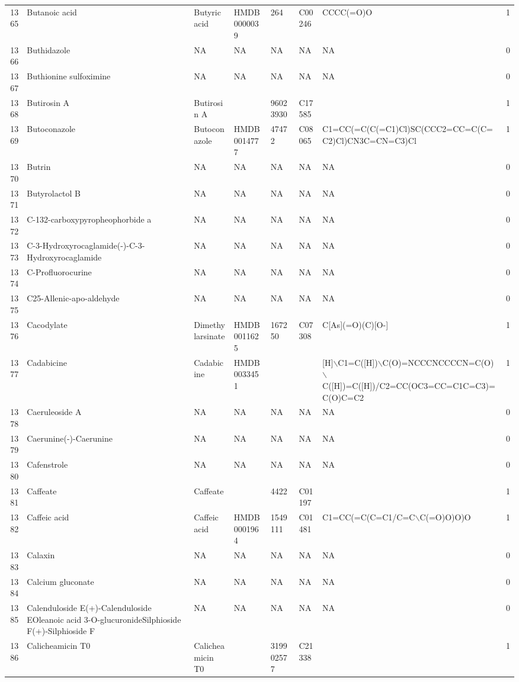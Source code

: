 \documentclass[a4paper]{article}
\begin{document}
\begin{longtable}{rlllllll}
  1365 & Butanoic acid & Butyric acid & HMDB0000039 & 264 & C00246 & CCCC(=O)O & 1 \\ 
  1366 & Buthidazole & NA & NA & NA & NA & NA & 0 \\ 
  1367 & Buthionine sulfoximine & NA & NA & NA & NA & NA & 0 \\ 
  1368 & Butirosin A & Butirosin A &  & 96023930 & C17585 &  & 1 \\ 
  1369 & Butoconazole & Butoconazole & HMDB0014777 & 47472 & C08065 & C1=CC(=C(C(=C1)Cl)SC(CCC2=CC=C(C=C2)Cl)CN3C=CN=C3)Cl & 1 \\ 
  1370 & Butrin & NA & NA & NA & NA & NA & 0 \\ 
  1371 & Butyrolactol B & NA & NA & NA & NA & NA & 0 \\ 
  1372 & C-132-carboxypyropheophorbide a & NA & NA & NA & NA & NA & 0 \\ 
  1373 & C-3-Hydroxyrocaglamide(-)-C-3-Hydroxyrocaglamide & NA & NA & NA & NA & NA & 0 \\ 
  1374 & C-Profluorocurine & NA & NA & NA & NA & NA & 0 \\ 
  1375 & C25-Allenic-apo-aldehyde & NA & NA & NA & NA & NA & 0 \\ 
  1376 & Cacodylate & Dimethylarsinate & HMDB0011625 & 167250 & C07308 & C[As](=O)(C)[O-] & 1 \\ 
  1377 & Cadabicine & Cadabicine & HMDB0033451 &  &  & [H]$\backslash$C1=C([H])$\backslash$C(O)=NCCCNCCCCN=C(O)$\backslash$C([H])=C([H])/C2=CC(OC3=CC=C1C=C3)=C(O)C=C2 & 1 \\ 
  1378 & Caeruleoside A & NA & NA & NA & NA & NA & 0 \\ 
  1379 & Caerunine(-)-Caerunine & NA & NA & NA & NA & NA & 0 \\ 
  1380 & Cafenstrole & NA & NA & NA & NA & NA & 0 \\ 
  1381 & Caffeate & Caffeate &  & 4422 & C01197 &  & 1 \\ 
  1382 & Caffeic acid & Caffeic acid & HMDB0001964 & 1549111 & C01481 & C1=CC(=C(C=C1/C=C$\backslash$C(=O)O)O)O & 1 \\ 
  1383 & Calaxin & NA & NA & NA & NA & NA & 0 \\ 
  1384 & Calcium gluconate & NA & NA & NA & NA & NA & 0 \\ 
  1385 & Calenduloside E(+)-Calenduloside EOleanoic acid 3-O-glucuronideSilphioside F(+)-Silphioside F & NA & NA & NA & NA & NA & 0 \\ 
  1386 & Calicheamicin T0 & Calicheamicin T0 &  & 319902577 & C21338 &  & 1 \\ 

\end{longtable}
\end{document}
